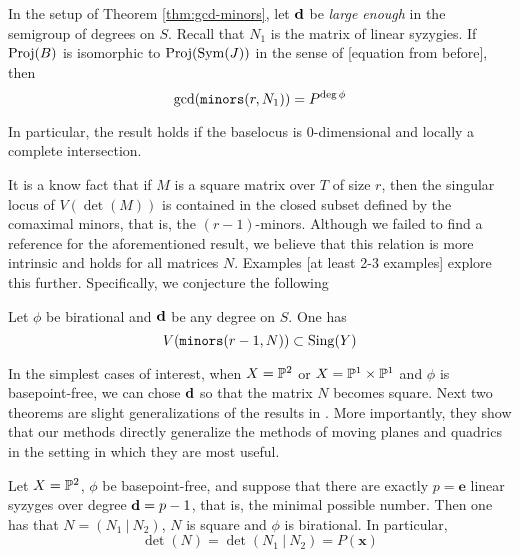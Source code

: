 \documentclass[fleqn,reqno]{amsart}
\numberwithin{first}{chapter}
\begin{document}
\begin{corollary}
\label{cor:approx-complex}
In the setup of Theorem \ref{thm:gcd-minors}, let $\mathbf d$ be {\em large enough} in the semigroup
of degrees on $S$.
Recall that $N_1$ is the matrix of linear syzygies.
If $\operatorname{Proj}(B)$ is isomorphic to $\operatorname{Proj}(\operatorname{Sym}(J))$ in the sense of [equation from before], then
\[
	\gcd(\mathop{\tt minors}(r, N_1))=P^{\deg\phi}
\]

In particular, the result holds if the baselocus is $0$-dimensional and locally a complete intersection.
\end{corollary}

\begin{paragraf*}
It is a know fact that if $M$ is a square matrix over $T$ of size $r$,
then the singular locus of $V(\det(M))$ is contained in the closed subset defined by the
comaximal minors, that is, the $(r-1)$-minors.
Although we failed to find a reference for the aforementioned result,
we believe that this relation is more intrinsic and holds for all matrices $N$.
Examples [at least 2-3 examples] explore this further.
Specifically, we conjecture the following
\end{paragraf*}

\begin{conjecture}
\label{conj:sing-locus}
Let $\phi$ be birational and $\mathbf d$ be any degree on $S$. One has
\[
V(\mathop{\tt minors}(r-1,N))\subset\mathrm{Sing}(Y)
\]
\end{conjecture}



\begin{paragraf*}
In the simplest cases of interest, when $X=\mathbb{P}^2$ or $X=\mathbb{P}^1\times\mathbb{P}^1$ and $\phi$ is basepoint-free,
we can chose $\mathbf d$ so that the matrix $N$ becomes square.
Next two theorems are slight generalizations of the results in \citet{00-CGZ-JSC}.
More importantly, they show that our methods directly generalize the methods of
moving planes and quadrics in the setting in which they are most useful.
\end{paragraf*}

\begin{theorem}
\label{thm:rel-moving-planes-quadrics}
Let $X=\mathbb{P}^2$, $\phi$ be basepoint-free,
and suppose that there are exactly $p=\mathbf e$ linear syzyges over degree $\mathbf d=p-1$,
that is, the minimal possible number.
Then one has that $N=(N_1~|~N_2)$, $N$ is square and $\phi$ is birational.
In particular,
\[
\det(N)=\det(N_1~|~N_2)=P(\mathbf x)
\]
\end{theorem}
\end{document}
